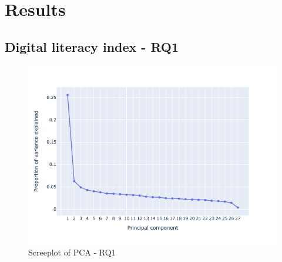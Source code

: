 \chapter{\label{ch:5-result}Results}

\section{Digital literacy index - RQ1}

\begin{figure}
    \centering
    \caption{Screeplot of PCA - RQ1}
    \label{fig:screeplot_rq1}
    \includegraphics[width=\textwidth]{figures/pca_screeplot_q1.png}
\end{figure}


